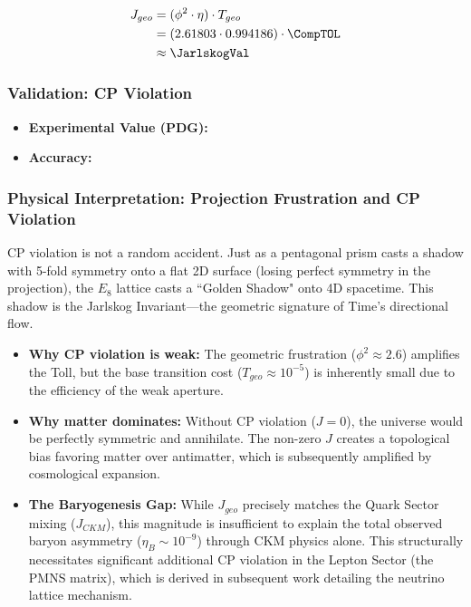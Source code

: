 \begin{equation}
\begin{split}
    J_{geo} &= (\phi^2 \cdot \eta) \cdot T_{geo} \\
    &= (2.61803 \cdot 0.994186) \cdot \CompTOL \\
    & \approx \mathbf{\JarlskogVal}
\end{split}
\end{equation}

\subsubsection{Validation: CP Violation}
\begin{itemize}
    \item \textbf{Experimental Value (PDG):} \JarlskogExperimentalValue
    \item \textbf{Accuracy:} \JarlskogAccText
\end{itemize}

\subsubsection{Physical Interpretation: Projection Frustration and CP Violation}
CP violation is not a random accident. Just as a pentagonal prism casts a shadow with 5-fold symmetry onto a flat 2D surface (losing perfect symmetry in the projection), the $E_8$ lattice casts a ``Golden Shadow" onto 4D spacetime. This shadow is the Jarlskog Invariant—the geometric signature of Time's directional flow.

\begin{itemize}
    \item \textbf{Why CP violation is weak:} The geometric frustration ($\phi^2 \approx 2.6$) amplifies the Toll, but the base transition cost ($T_{geo} \approx 10^{-5}$) is inherently small due to the efficiency of the weak aperture.
    
    \item \textbf{Why matter dominates:} Without CP violation ($J=0$), the universe would be perfectly symmetric and annihilate. The non-zero $J$ creates a topological bias favoring matter over antimatter, which is subsequently amplified by cosmological expansion.
    
    \item \textbf{The Baryogenesis Gap:} While $J_{geo}$ precisely matches the Quark Sector mixing ($J_{CKM}$), this magnitude is insufficient to explain the total observed baryon asymmetry ($\eta_B \sim 10^{-9}$) through CKM physics alone. This structurally necessitates significant additional CP violation in the Lepton Sector (the PMNS matrix), which is derived in subsequent work detailing the neutrino lattice mechanism.
\end{itemize}